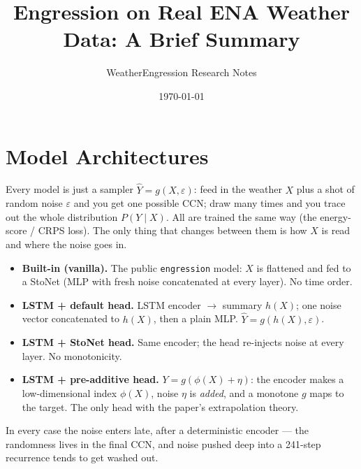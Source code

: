 \documentclass[11pt]{article}
\title{Engression on Real ENA Weather Data: A Brief Summary}
\author{WeatherEngression Research Notes}
\date{\today}
\begin{document}
\maketitle

\section{Model Architectures}

Every model is just a sampler \(\widehat{Y}=g(X,\varepsilon)\): feed in the weather
\(X\) plus a shot of random noise \(\varepsilon\) and you get one possible CCN; draw
many times and you trace out the whole distribution \(P(Y\mid X)\). All are trained the
same way (the energy-score / CRPS loss). The only thing that changes between them is how
\(X\) is read and where the noise goes in.

\begin{itemize}
  \item \textbf{Built-in (vanilla).} The public \texttt{engression} model: \(X\) is
  flattened and fed to a StoNet (MLP with fresh noise concatenated at every layer).
  No time order.
  \item \textbf{LSTM + default head.} LSTM encoder \(\to\) summary \(h(X)\); one
  noise vector concatenated to \(h(X)\), then a plain MLP.
  \(\widehat{Y}=g(h(X),\varepsilon)\).
  \item \textbf{LSTM + StoNet head.} Same encoder; the head re-injects noise at
  every layer. No monotonicity.
  \item \textbf{LSTM + pre-additive head.} \(Y=g(\phi(X)+\eta)\): the encoder makes
  a low-dimensional index \(\phi(X)\), noise \(\eta\) is \emph{added}, and a
  monotone \(g\) maps to the target. The only head with the paper's extrapolation
  theory.
\end{itemize}

\noindent
In every case the noise enters late, after a deterministic encoder --- the randomness
lives in the final CCN, and noise pushed deep into a 241-step recurrence tends to get
washed out.
\end{document}
